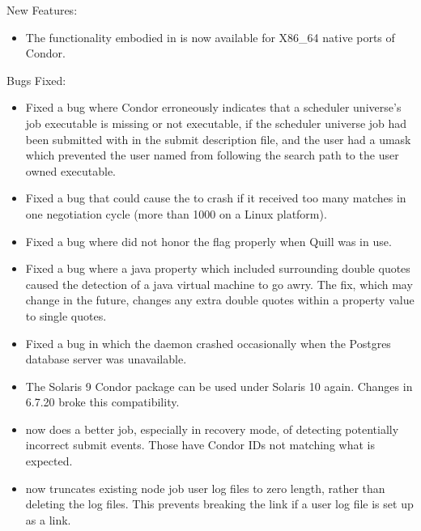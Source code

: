 \noindent New Features:

\begin{itemize}

\item The functionality embodied in   is now
available for X86\_64 native ports of Condor.

\end{itemize}

\noindent Bugs Fixed:

\begin{itemize}

\item Fixed a bug where Condor erroneously indicates that a scheduler
universe's job executable is missing or not executable, if the scheduler
universe job had been submitted with
 in the submit
description file, and the user had a umask which prevented the user
named  from following the search path to the
user owned executable.

\item Fixed a bug that could cause the  to crash if it
received too many matches in one negotiation cycle (more than 1000 on a
Linux platform).

\item Fixed a bug where  did not honor the  flag
properly when Quill was in use.

\item Fixed a bug where a java property which included surrounding double quotes
caused the detection of a java virtual machine to go awry. 
The fix, which may change in the future, changes any extra double quotes
within a property value to single quotes.

\item Fixed a bug in which the  daemon 
crashed occasionally when the Postgres database
server was unavailable.

\item The Solaris 9 Condor package can be used under Solaris 10 again.
Changes in 6.7.20 broke this compatibility.

\item {} now does a better job, especially in recovery mode,
of detecting potentially incorrect submit events.
Those have Condor IDs not matching what is expected.

\item {} now truncates existing node job user log files
to zero length, rather than deleting the log files.  This prevents breaking the
link if a user log file is set up as a link.


\end{itemize}
